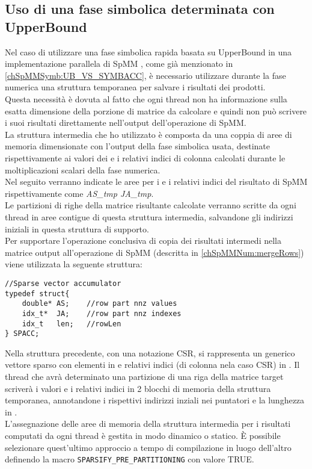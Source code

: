 \subsection{Uso di una fase simbolica determinata con UpperBound}
Nel caso di utilizzare una fase simbolica rapida basata su UpperBound in una implementazione parallela di SpMM
, come già menzionato in \ref{chSpMMSymb:UB_VS_SYMBACC},
è necessario utilizzare durante la fase numerica una struttura temporanea per salvare i risultati dei prodotti.\\
\label{chSpMMNum:UB_necessitaCopyBack}
Questa necessità è dovuta al fatto che ogni thread non ha informazione sulla esatta dimensione della porzione di
matrice da calcolare e quindi non può scrivere i suoi risultati direttamente nell'output dell'operazione di SpMM.\\
La struttura intermedia che ho utilizzato è composta da una coppia di aree di memoria
dimensionate con l'output della fase simbolica usata, destinate rispettivamente ai
valori dei \nnz e i relativi indici di colonna calcolati durante le moltiplicazioni scalari della fase numerica.\\
Nel seguito verranno indicate le aree per i \nnz e i relativi indici del risultato di SpMM rispettivamente come 
\emph{AS\_tmp JA\_tmp}.\\
\label{chSpMMNum:SPACC}	%
Le partizioni di righe della matrice risultante calcolate verranno scritte da ogni thread
in aree contigue di questa struttura intermedia, salvandone gli indirizzi iniziali 
in questa struttura di supporto.\\
Per supportare l'operazione conclusiva di copia dei risultati intermedi nella matrice output all'operazione di SpMM 
(descritta in \ref{chSpMMNum:mergeRows}) viene utilizzata la seguente struttura:
\begin{lstlisting}
//Sparse vector accumulator
typedef struct{                                               
    double* AS;    //row part nnz values                                         
    idx_t*  JA;    //row part nnz indexes
    idx_t   len;   //rowLen
} SPACC;           
\end{lstlisting}
Nella struttura precedente, con una notazione CSR, si rappresenta un generico vettore sparso 
con  elementi \nnz in  e relativi indici (di colonna nela caso CSR) in .
Il thread che avrà determinato una partizione di una riga della matrice target
scriverà i valori \nnz e i relativi indici in 2 blocchi di memoria della struttura temporanea,
annotandone i rispettivi indirizzi inziali nei puntatori  e la lunghezza in .\\
L'assegnazione delle aree di memoria della struttura intermedia per i risultati computati 
da ogni thread è gestita in modo dinamico o statico.
È possibile selezionare quest'ultimo approccio a tempo di compilazione in luogo dell'altro
definendo la macro \verb|SPARSIFY_PRE_PARTITIONING| con valore {TRUE}.\\

